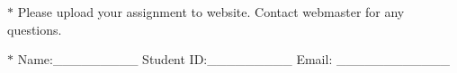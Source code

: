 \documentclass[12pt,a4paper]{article}
\theoremstyle{definition}
\begin{document}
\noindent

\noindent{}
\begin{center}
\footnotesize{\color{red}$*$ Please upload your assignment to website. Contact webmaster for any questions.}

\footnotesize{\color{blue}$*$ Name:\_\_\_\_\_\_\_\_\_  \quad Student ID:\_\_\_\_\_\_\_\_\_ \quad Email: \_\_\_\_\_\_\_\_\_\_\_\_}
\end{center}
\end{document}
